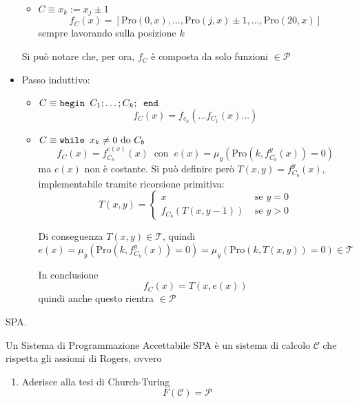 \documentclass[12pt, answers]{exam}
\theoremstyle{plain}
\newcommand{\C}{\mathcal{C}}
\newcommand{\cp}{\mathcal{P}}
\newcommand{\T}{\mathcal{T}}
\newcommand{\pro}{\text{Pro}}
\begin{document}
\begin{questions}
\begin{solution}
\begin{itemize}
\begin{itemize}
                    \item $C \equiv x_k := x_j \pm 1$
                    $$ f_C (x) = \left[\pro (0, x), \dots, \pro (j, x) \pm 1, \dots, \pro(20, x) \right] $$
                    sempre lavorando sulla posizione $k$
                \end{itemize}
                Si può notare che, per ora, $f_C$ è composta da solo funzioni $\in \cp$
                
                \item Passo induttivo:
                \begin{itemize}
                    \item $C \equiv \text{\texttt{begin }} C_1; \dots; C_k; \text{\texttt{ end}}$
                    $$ f_C (x) = f_{c_k}( \dots f_{C_1}(x) \dots) $$
                    
                    \item $C \equiv \text{\texttt{while }} x_k \neq 0 \text{ do } C_b$
                    $$ f_C (x) = f_{C_b}^{e(x)} (x) \ \text{ con } \ e(x) = \mu_y (\pro (k, f_{C_b}^y (x)) = 0) $$
                    ma $e(x)$ non è costante. Si può definire però $ T(x,y) = f_{C_b}^y (x) $, implementabile tramite ricorsione primitiva:
                    $$ T(x, y) = \begin{cases}
                        x & \text{ se } y = 0 \\
                        f_{C_b} (T (x, y-1)) & \text{ se } y > 0
                    \end{cases}$$
                    
                    Di conseguenza $T(x,y) \in \T$, quindi
                    $$ e(x) = \mu_y (\pro (k, f_{C_b}^y (x)) = 0) = \mu_y (\pro (k, T(x,y)) = 0) \in \T $$
                    
                    In conclusione
                    $$ f_C (x) = T(x, e(x))$$
                    quindi anche questo rientra $\in \cp$
                \end{itemize}
            \end{itemize}
        \end{solution}
        
        \question SPA.
        
        \begin{solution}
            Un Sistema di Programmazione Accettabile SPA è un sistema di calcolo $\C$ che rispetta gli assiomi di Rogers, ovvero
            \begin{enumerate}
                \item Aderisce alla tesi di Church-Turing
                $$ F(\C) = \cp $$
                

\end{enumerate}
\end{solution}
\end{questions}
\end{document}
